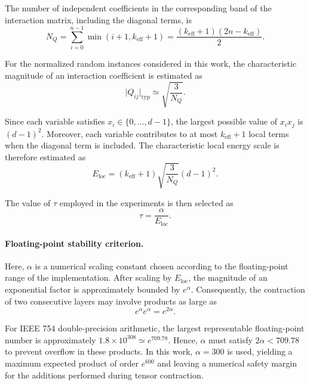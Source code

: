 \documentclass[%
 reprint,
 amsmath,amssymb,
 aps,
 pra,showkeys,
]{revtex4-2}
\begin{document}
The number of independent coefficients in the corresponding band of
the interaction matrix, including the diagonal terms, is
\begin{equation}
    N_Q
    =
    \sum_{i=0}^{n-1}
    \min(i+1,k_{\mathrm{eff}}+1)
    =
    \frac{
        (k_{\mathrm{eff}}+1)
        (2n-k_{\mathrm{eff}})
    }{2}.
    \label{eq:number-q-coefficients}
\end{equation}

For the normalized random instances considered in this work, the
characteristic magnitude of an interaction coefficient is estimated as
\begin{equation}
    \lvert Q_{ij}\rvert_{\mathrm{typ}}
    \simeq
    \sqrt{\frac{3}{N_Q}}.
    \label{eq:typical-q-coefficient}
\end{equation}

Since each variable satisfies $x_i\in\{0,\ldots,d-1\}$, the largest
possible value of $x_i x_j$ is $(d-1)^2$. Moreover, each variable
contributes to at most $k_{\mathrm{eff}}+1$ local terms when the
diagonal term is included. The characteristic local energy scale is
therefore estimated as
\begin{equation}
    E_{\mathrm{loc}}
    =
    (k_{\mathrm{eff}}+1)
    \sqrt{\frac{3}{N_Q}}
    (d-1)^2.
    \label{eq:local-energy-scale}
\end{equation}

The value of $\tau$ employed in the experiments is then selected as
\begin{equation}
    \boxed{
        \tau=\frac{\alpha}{E_{\mathrm{loc}}}
    }.
    \label{eq:tau-selection}
\end{equation}

\paragraph{Floating-point stability criterion.}

Here, $\alpha$ is a numerical scaling constant chosen according to the
floating-point range of the implementation. After scaling by
$E_{\mathrm{loc}}$, the magnitude of an exponential factor is
approximately bounded by $e^\alpha$. Consequently, the contraction of
two consecutive layers may involve products as large as
\begin{equation}
    e^\alpha e^\alpha = e^{2\alpha}.
\end{equation}

For IEEE 754 double-precision arithmetic, the largest representable
floating-point number is approximately
$1.8\times10^{308}\simeq e^{709.78}$. Hence, $\alpha$ must satisfy
$2\alpha<709.78$ to prevent overflow in these products. In this work,
$\alpha=300$ is used, yielding a maximum expected product of order
$e^{600}$ and leaving a numerical safety margin for the additions
performed during tensor contraction.
\end{document}
